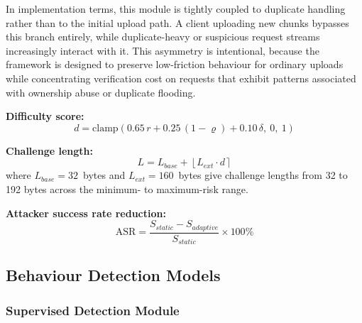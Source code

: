 \documentclass[12pt,a4paper,oneside]{report}
\begin{document}
In implementation terms, this module is tightly coupled to duplicate handling rather than to the initial upload path. A client uploading new chunks bypasses this branch entirely, while duplicate-heavy or suspicious request streams increasingly interact with it. This asymmetry is intentional, because the framework is designed to preserve low-friction behaviour for ordinary uploads while concentrating verification cost on requests that exhibit patterns associated with ownership abuse or duplicate flooding.

\textbf{Difficulty score:}
\begin{equation}
  d = \mathrm{clamp}\!\left(0.65\,r + 0.25\,(1-\varrho) + 0.10\,\delta,\ 0,\ 1\right)
  \label{eq:diff2}
\end{equation}

\textbf{Challenge length:}
\begin{equation}
  L = L_{\mathit{base}} + \left\lfloor L_{\mathit{ext}} \cdot d \right\rceil
  \label{eq:length}
\end{equation}
where $L_{\mathit{base}} = 32$~bytes and $L_{\mathit{ext}} = 160$~bytes give challenge lengths from 32 to 192 bytes across the minimum- to maximum-risk range.

\textbf{Attacker success rate reduction:}
\begin{equation}
  \mathrm{ASR} = \frac{S_{\mathit{static}} - S_{\mathit{adaptive}}}{S_{\mathit{static}}} \times 100\%
  \label{eq:asr}
\end{equation}

\subsection{Behaviour Detection Models}

\subsubsection{Supervised Detection Module}
\end{document}
